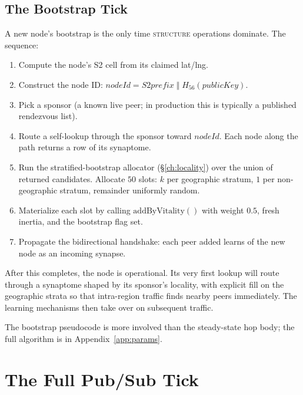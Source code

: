 \documentclass[twoside,nobib]{tufte-book}
\begin{document}
\section{The Bootstrap Tick}
\label{sec:nh1-bootstrap-tick}

A new node's bootstrap is the only time
\textsc{structure} operations dominate. The sequence:

\begin{enumerate}\setlength\itemsep{0.15em}
  \item Compute the node's S2 cell from its claimed lat/lng.
  \item Construct the node ID:
    $\mathit{nodeId} = \mathit{S2 prefix}\;\Vert\;
    H_{56}(\mathit{publicKey})$.
  \item Pick a sponsor (a known live peer; in production this is
    typically a published rendezvous list).
  \item Route a self-lookup through the sponsor toward
    $\mathit{nodeId}$. Each node along the path returns a row of
    its synaptome.
  \item Run the stratified-bootstrap allocator
    (\S\ref{ch:locality}) over the union of returned candidates.
    Allocate $50$ slots: $k$ per geographic stratum, $1$ per
    non-geographic stratum, remainder uniformly random.
  \item Materialize each slot by calling
    $\mathrm{addByVitality}()$ with weight $0.5$, fresh inertia,
    and the bootstrap flag set.
  \item Propagate the bidirectional handshake: each peer added
    learns of the new node as an incoming synapse.
\end{enumerate}

After this completes, the node is operational. Its very first
lookup will route through a synaptome shaped by its sponsor's
locality, with explicit fill on the geographic strata so that
intra-region traffic finds nearby peers immediately. The
learning mechanisms then take over on subsequent traffic.

The bootstrap pseudocode is more involved than the steady-state
hop body; the full algorithm is in Appendix~\ref{app:params}.


\chapter{The Full Pub/Sub Tick}
\label{ch:nh1-pubsub}
\end{document}
